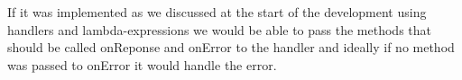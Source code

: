If it was implemented as we discussed at the start of the development using
handlers and lambda-expressions we would be able to pass the methods that should
be called onReponse and onError to the handler and ideally if no method was
passed to onError it would handle the error.




% 













